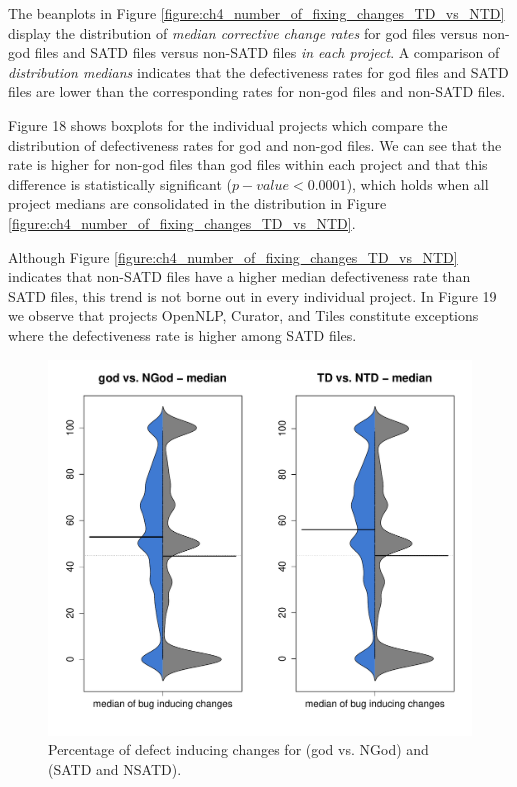 
The beanplots in Figure \ref{figure:ch4_number_of_fixing_changes_TD_vs_NTD} display the distribution of \textit{median corrective change rates} for god files versus non-god files and SATD files versus non-SATD files \textit{in each project}. A comparison of \textit{distribution medians} indicates that the defectiveness rates for god files and SATD files are lower than the corresponding rates for non-god files and non-SATD files.

Figure 18 shows boxplots for the individual projects which compare the distribution of defectiveness rates for god and non-god files. We can see that the rate is higher for non-god files than god files within each project and that this difference is statistically significant ($p-value < 0.0001$), which holds when all project medians are consolidated in the distribution in Figure \ref{figure:ch4_number_of_fixing_changes_TD_vs_NTD}.

Although Figure \ref{figure:ch4_number_of_fixing_changes_TD_vs_NTD} indicates that non-SATD files have a higher median defectiveness rate than SATD files, this trend is not borne out in every individual project. In Figure 19 we observe that projects OpenNLP, Curator, and Tiles constitute exceptions where the defectiveness rate is higher among SATD files.


\begin{figure}[tb!]
	\centering
	\includegraphics[width=140mm]{figures/chapter4/rq2_distrubtion_god_and_td}
	\caption{Percentage of defect inducing changes for (god vs. NGod) and (SATD and NSATD).}
	\label{figure:ch4_bug_inducing_changes}
\end{figure}

